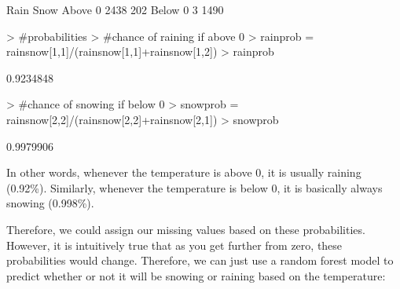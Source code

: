 \documentclass[11pt, a4paper]{article}
\begin{document}
\begin{Schunk}
\begin{Soutput}
          Rain Snow
  Above 0 2438  202
  Below 0    3 1490
\end{Soutput}
\begin{Sinput}
> #probabilities
> #chance of raining if above 0
> rainprob = rainsnow[1,1]/(rainsnow[1,1]+rainsnow[1,2])
> rainprob
\end{Sinput}
\begin{Soutput}
[1] 0.9234848
\end{Soutput}
\begin{Sinput}
> #chance of snowing if below 0
> snowprob = rainsnow[2,2]/(rainsnow[2,2]+rainsnow[2,1])
> snowprob
\end{Sinput}
\begin{Soutput}
[1] 0.9979906
\end{Soutput}
\end{Schunk}

In other words, whenever the temperature is above 0, it is usually raining (0.92\%). Similarly, whenever the temperature is below 0, it is basically always snowing (0.998\%).
\par
Therefore, we could assign our missing values based on these probabilities. However, it is intuitively true that as you get further from zero, these probabilities would change. Therefore, we can just use a random forest model to predict whether or not it will be snowing or raining based on the temperature:
\end{document}
